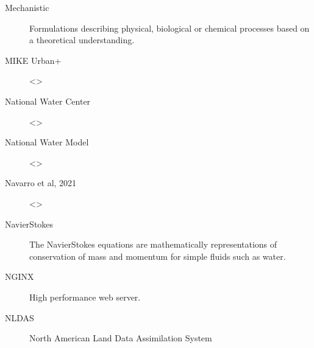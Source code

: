 \documentclass[letterpaper,12pt,english]{book}
\begin{document}
\begin{description}
\item[{Mechanistic\label{\detokenize{glossary:term-Mechanistic}}}] \leavevmode
\sphinxAtStartPar
Formulations describing physical, biological or chemical processes based on a theoretical understanding.

\item[{MIKE Urban+\label{\detokenize{glossary:term-MIKE-Urban}}}] \leavevmode
\sphinxAtStartPar
\textless{}\textgreater{}

\item[{National Water Center\label{\detokenize{glossary:term-National-Water-Center}}}] \leavevmode
\sphinxAtStartPar
\textless{}\textgreater{}

\item[{National Water Model\label{\detokenize{glossary:term-National-Water-Model}}}] \leavevmode
\sphinxAtStartPar
\textless{}\textgreater{}

\item[{Navarro et al, 2021\label{\detokenize{glossary:term-Navarro-et-al-2021}}}] \leavevmode
\sphinxAtStartPar
\textless{}\textgreater{}

\item[{Navier\sphinxhyphen{}Stokes\label{\detokenize{glossary:term-Navier-Stokes}}}] \leavevmode
\sphinxAtStartPar
The Navier\textendash{}Stokes equations are mathematically representations of conservation of mass and momentum for simple fluids such as water.

\item[{NGINX\label{\detokenize{glossary:term-NGINX}}}] \leavevmode
\sphinxAtStartPar
High performance web server.

\item[{NLDAS\label{\detokenize{glossary:term-NLDAS}}}] \leavevmode
\sphinxAtStartPar
North American Land Data Assimilation System


\end{description}
\end{document}
